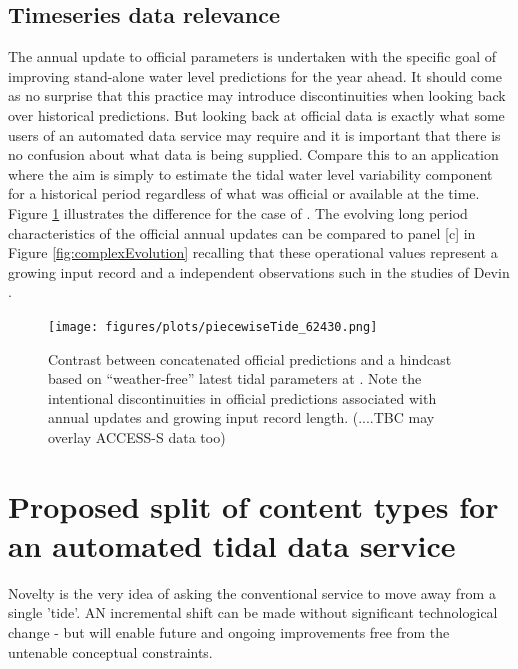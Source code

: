 \subsection{Timeseries data relevance}
The annual update to official parameters is undertaken with the specific goal  of improving stand-alone water level predictions for the year ahead.    It should come as no surprise that this practice may introduce discontinuities when looking back over historical predictions.
But looking back at official data is exactly what some users of an automated data service may require and it is important that there is no confusion about what data is being supplied.
Compare this to an application where the aim is simply to estimate the tidal water level variability component  for a historical period regardless of what was official or available at the time.
Figure \ref{fig:tideOverlay} illustrates the difference for the case of  \Dname{}.  The evolving long period characteristics of the official annual updates can be compared to panel [c] in Figure \ref{fig:complexEvolution} recalling that these operational values represent a growing input record and a independent observations such in the studies of Devin \cite{10.1002/2017jc013165}. 

\begin{figure}[H]\centering
    \texttt{[image: figures/plots/piecewiseTide\_62430.png]}
        \caption{Contrast between concatenated official predictions and a hindcast based on ``weather-free'' latest tidal parameters at \Dname{}.  Note the intentional discontinuities in official predictions associated with annual updates and growing input record length.   (....TBC may overlay ACCESS-S data too) }
    \label{fig:tideOverlay}
\end{figure}   

\section{Proposed split of content types for an automated tidal data service}
\label{Sec:proposed}

Novelty is the very idea of asking the conventional service to move away from a single 'tide'.
AN incremental shift can be made without significant technological change - but will enable future and ongoing improvements free from the untenable conceptual constraints. 

